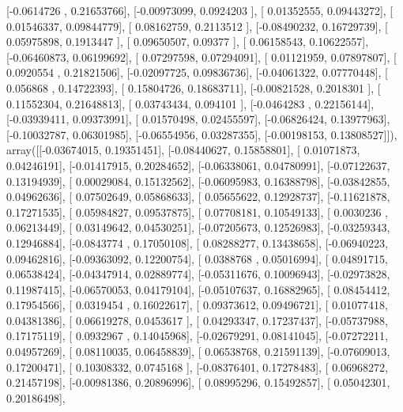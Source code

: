 \documentclass{article}
\begin{document}
       [-0.0614726 ,  0.21653766],
       [-0.00973099,  0.0924203 ],
       [ 0.01352555,  0.09443272],
       [ 0.01546337,  0.09844779],
       [ 0.08162759,  0.2113512 ],
       [-0.08490232,  0.16729739],
       [ 0.05975898,  0.1913447 ],
       [ 0.09650507,  0.09377   ],
       [ 0.06158543,  0.10622557],
       [-0.06460873,  0.06199692],
       [ 0.07297598,  0.07294091],
       [ 0.01121959,  0.07897807],
       [ 0.0920554 ,  0.21821506],
       [-0.02097725,  0.09836736],
       [-0.04061322,  0.07770448],
       [ 0.056868  ,  0.14722393],
       [ 0.15804726,  0.18683711],
       [-0.00821528,  0.2018301 ],
       [ 0.11552304,  0.21648813],
       [ 0.03743434,  0.094101  ],
       [-0.0464283 ,  0.22156144],
       [-0.03939411,  0.09373991],
       [ 0.01570498,  0.02455597],
       [-0.06826424,  0.13977963],
       [-0.10032787,  0.06301985],
       [-0.06554956,  0.03287355],
       [-0.00198153,  0.13808527]]), array([[-0.03674015,  0.19351451],
       [-0.08440627,  0.15858801],
       [ 0.01071873,  0.04246191],
       [-0.01417915,  0.20284652],
       [-0.06338061,  0.04780991],
       [-0.07122637,  0.13194939],
       [ 0.00029084,  0.15132562],
       [-0.06095983,  0.16388798],
       [-0.03842855,  0.04962636],
       [ 0.07502649,  0.05868633],
       [ 0.05655622,  0.12928737],
       [-0.11621878,  0.17271535],
       [ 0.05984827,  0.09537875],
       [ 0.07708181,  0.10549133],
       [ 0.0030236 ,  0.06213449],
       [ 0.03149642,  0.04530251],
       [-0.07205673,  0.12526983],
       [-0.03259343,  0.12946884],
       [-0.0843774 ,  0.17050108],
       [ 0.08288277,  0.13438658],
       [-0.06940223,  0.09462816],
       [-0.09363092,  0.12200754],
       [ 0.0388768 ,  0.05016994],
       [ 0.04891715,  0.06538424],
       [-0.04347914,  0.02889774],
       [-0.05311676,  0.10096943],
       [-0.02973828,  0.11987415],
       [-0.06570053,  0.04179104],
       [-0.05107637,  0.16882965],
       [ 0.08454412,  0.17954566],
       [ 0.0319454 ,  0.16022617],
       [ 0.09373612,  0.09496721],
       [ 0.01077418,  0.04381386],
       [ 0.06619278,  0.0453617 ],
       [ 0.04293347,  0.17237437],
       [-0.05737988,  0.17175119],
       [ 0.0932967 ,  0.14045968],
       [-0.02679291,  0.08141045],
       [-0.07272211,  0.04957269],
       [ 0.08110035,  0.06458839],
       [ 0.06538768,  0.21591139],
       [-0.07609013,  0.17200471],
       [ 0.10308332,  0.0745168 ],
       [-0.08376401,  0.17278483],
       [ 0.06968272,  0.21457198],
       [-0.00981386,  0.20896996],
       [ 0.08995296,  0.15492857],
       [ 0.05042301,  0.20186498],
\end{document}
